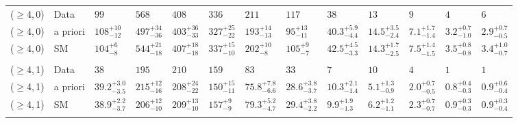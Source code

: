 \begin{table}[!t]
{\begin{tabular}{ lllllllllllll }
    ($\geq$4,\,0)
             & Data
             & $99$
             & $568$
             & $408$
             & $336$
             & $211$
             & $117$
             & $38$
             & $13$
             & $9$
             & $4$
             & $6$                                      \\
    ($\geq$4,\,0)
             & a priori
             & $108^{+10}_{-12}$
             & $497^{+34}_{-36}$
             & $403^{+36}_{-33}$
             & $327^{+25}_{-22}$
             & $193^{+14}_{-13}$
             & $95^{+13}_{-11}$
             & $40.3^{+5.9}_{-4.4}$
             & $14.5^{+3.5}_{-2.4}$
             & $7.1^{+1.7}_{-1.4}$
             & $3.2^{+0.7}_{-1.0}$
             & $2.9^{+0.7}_{-0.5}$                      \\
    ($\geq$4,\,0)
             & SM
             & $104^{+6}_{-8}$
             & $544^{+21}_{-18}$
             & $407^{+18}_{-18}$
             & $337^{+15}_{-10}$
             & $202^{+10}_{-8}$
             & $105^{+9}_{-7}$
             & $42.5^{+4.5}_{-3.3}$
             & $14.3^{+1.7}_{-2.5}$
             & $7.5^{+1.4}_{-1.5}$
             & $3.5^{+0.8}_{-0.8}$
             & $3.4^{+1.0}_{-0.7}$                      \\\\[-2ex]
    ($\geq$4,\,1)
             & Data
             & $38$
             & $195$
             & $210$
             & $159$
             & $83$
             & $33$
             & $7$
             & $10$
             & $4$
             & $1$
             & $1$                                      \\
    ($\geq$4,\,1)
             & a priori
             & $39.2^{+3.0}_{-3.5}$
             & $215^{+12}_{-16}$
             & $208^{+24}_{-22}$
             & $150^{+15}_{-11}$
             & $75.8^{+7.8}_{-6.6}$
             & $28.6^{+3.8}_{-3.7}$
             & $10.3^{+2.1}_{-1.4}$
             & $5.1^{+1.3}_{-0.9}$
             & $2.0^{+0.7}_{-0.5}$
             & $0.8^{+0.4}_{-0.3}$
             & $0.9^{+0.6}_{-0.4}$                      \\
    ($\geq$4,\,1)
             & SM
             & $38.9^{+2.2}_{-3.7}$
             & $206^{+12}_{-10}$
             & $209^{+13}_{-10}$
             & $157^{+9}_{-9}$
             & $79.3^{+5.2}_{-4.7}$
             & $29.4^{+3.8}_{-2.2}$
             & $9.9^{+1.9}_{-1.3}$
             & $6.2^{+1.2}_{-1.1}$
             & $2.3^{+0.7}_{-0.7}$
             & $0.9^{+0.3}_{-0.3}$
             & $0.9^{+0.3}_{-0.4}$                      \\\\[-2ex]

\end{tabular}}
\end{table}
